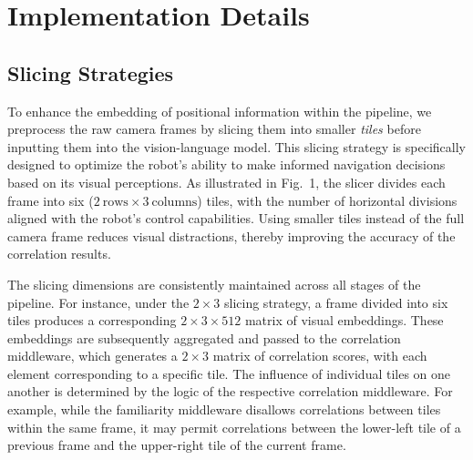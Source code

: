 \section{Implementation Details}
\subsection{Slicing Strategies}\label{sec:impl/slicing}
To enhance the embedding of positional information within the pipeline, we preprocess the raw camera frames by slicing them into smaller \textit{tiles} before inputting them into the vision-language model. This slicing strategy is specifically designed to optimize the robot's ability to make informed navigation decisions based on its visual perceptions. As illustrated in Fig.~1, the slicer divides each frame into six ($2~\text{rows} \times 3~\text{columns}$) tiles, with the number of horizontal divisions aligned with the robot's control capabilities. Using smaller tiles instead of the full camera frame reduces visual distractions, thereby improving the accuracy of the correlation results.


The slicing dimensions are consistently maintained across all stages of the pipeline. For instance, under the $2\times3$  slicing strategy, a frame divided into six tiles produces a corresponding 
$2\times3\times512$ matrix of visual embeddings. These embeddings are subsequently aggregated and passed to the correlation middleware, which generates a $2\times3$ matrix of correlation scores, with each element corresponding to a specific tile. The influence of individual tiles on one another is determined by the logic of the respective correlation middleware. For example, while the familiarity middleware disallows correlations between tiles within the same frame, it may permit correlations between the lower-left tile of a previous frame and the upper-right tile of the current frame.


